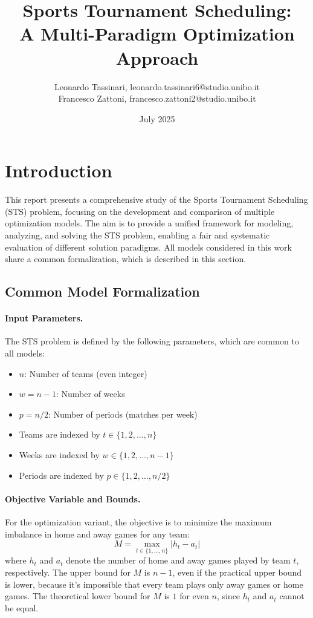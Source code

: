 \documentclass[11pt]{article}
\title{\textbf{Sports Tournament Scheduling: \\
A Multi-Paradigm Optimization Approach}}
\author{
Leonardo Tassinari, leonardo.tassinari6@studio.unibo.it
\\
Francesco Zattoni, francesco.zattoni2@studio.unibo.it
\\ 
}
\date{July 2025}
\begin{document}
\maketitle

\section{Introduction}

This report presents a comprehensive study of the Sports Tournament Scheduling (STS) problem, focusing on the development and comparison of multiple optimization models. The aim is to provide a unified framework for modeling, analyzing, and solving the STS problem, enabling a fair and systematic evaluation of different solution paradigms. All models considered in this work share a common formalization, which is described in this section.

\subsection{Common Model Formalization}

\paragraph{Input Parameters.}
The STS problem is defined by the following parameters, which are common to all models:
\begin{itemize}
    \item $n$: Number of teams (even integer)
    \item $w = n-1$: Number of weeks
    \item $p = n/2$: Number of periods (matches per week)
    \item Teams are indexed by $t \in \{1, 2, \ldots, n\}$
    \item Weeks are indexed by $w \in \{1, 2, \ldots, n-1\}$
    \item Periods are indexed by $p \in \{1, 2, \ldots, n/2\}$
\end{itemize}

\paragraph{Objective Variable and Bounds.}
For the optimization variant, the objective is to minimize the maximum imbalance in home and away games for any team:
\[
M = \max_{t \in \{1, \ldots, n\}} |h_t - a_t|
\]
where $h_t$ and $a_t$ denote the number of home and away games played by team $t$, respectively. The upper bound for $M$ is $n-1$, even if the practical upper bound is lower, because it's impossible that every team plays only away games or home games. The theoretical lower bound for $M$ is $1$ for even $n$, since $h_t$ and $a_t$ cannot be equal.
\end{document}
